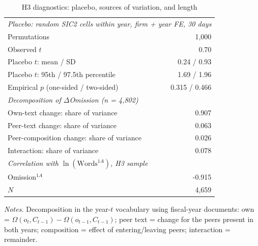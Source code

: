 \begin{table}[htbp]
\centering
\caption{H3 diagnostics: placebo, sources of variation, and length}
\label{tab:silence_diag}
\small
\begin{tabular}{lr}
\toprule
\multicolumn{2}{l}{\emph{Placebo: random SIC2 cells within year, firm + year FE, 30 days}} \\
Permutations & 1,000 \\
Observed $t$ & 0.70 \\
Placebo $t$: mean / SD & 0.24 / 0.93 \\
Placebo $t$: 95th / 97.5th percentile & 1.69 / 1.96 \\
Empirical $p$ (one-sided / two-sided) & 0.315 / 0.466 \\
\midrule
\multicolumn{2}{l}{\emph{Decomposition of $\Delta$Omission (n = 4,802)}} \\
Own-text change: share of variance & 0.907 \\
Peer-text change: share of variance & 0.063 \\
Peer-composition change: share of variance & 0.026 \\
Interaction: share of variance & 0.078 \\
\midrule
\multicolumn{2}{l}{\emph{Correlation with $\ln(\text{Words}^{1A})$, H3 sample}} \\
Omission$^{1A}$ & -0.915 \\
$N$ & 4,659 \\
\bottomrule
\end{tabular}
\par\smallskip
\begin{minipage}{\linewidth}\footnotesize
\emph{Notes.} Decomposition in the year-$t$ vocabulary using fiscal-year documents: own = $\Omega(o_t,C_{t-1})-\Omega(o_{t-1},C_{t-1})$; peer text = change for the peers present in both years; composition = effect of entering/leaving peers; interaction = remainder.
\end{minipage}
\end{table}
